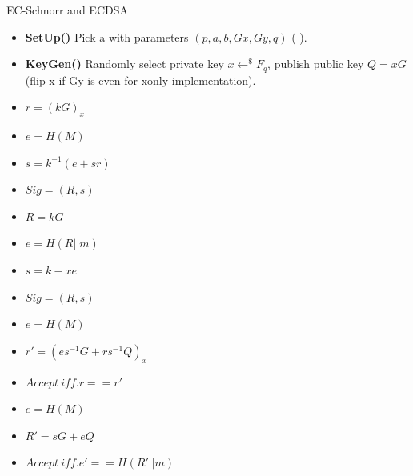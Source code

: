 \documentclass[aspectratio=43]{beamer}
\begin{document}
\begin{frame}{EC-Schnorr and ECDSA}

\begin{definition}
\begin{itemize}
\item[] {\textbf {SetUp()}} 
Pick a \href{https://github.com/LedgerHQ/speculos/blob/master/src/bolos/cx_ec_domain.c}{} with parameters $(p,a,b,Gx,Gy,q)$ (\href{https://hyperelliptic.org/EFD/g1p/auto-shortw.html}{} ).

\item[] {\textbf {KeyGen()}} Randomly select private key $x\leftarrow^\$ F_q$, publish public key $Q=xG$ (flip x if Gy is even for xonly implementation).
\end{itemize}
\end{definition}


{
\begin{definition}
\begin{itemize}
\item $r=(kG)_x$
\item $e=H(M)$
\item $s=k^{-1}(e+sr)$
\item $Sig=(R,s)$
\end{itemize}
\end{definition}
}

{
\begin{definition}
\begin{itemize}
\item $R=kG$
\item $e=H(R||m)$
\item $s=k-xe$
\item $Sig=(R,s)$
\end{itemize}
\end{definition}
}

{
\begin{definition}
\begin{itemize}

\item $e=H(M)$
\item $r'=(es^{-1}G+rs^{-1}Q)_x $
\item $Accept~ iff. r==r'$
\end{itemize}
\end{definition}
}

{
\begin{definition}
\begin{itemize}

\item $e=H(M)$
\item $R'=sG+eQ$
\item $Accept~ iff. e'==H(R'||m)$
\end{itemize}
\end{definition}
}

\end{frame}
\end{document}
